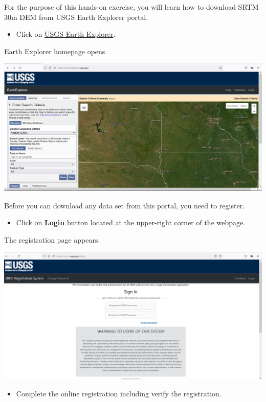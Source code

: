 \documentclass[
  letterpaper,
  DIV=11,
  numbers=noendperiod]{scrreprt}
\providecommand{\tightlist}{%
  \setlength{\itemsep}{0pt}\setlength{\parskip}{0pt}}\usepackage{longtable,booktabs,array}
\begin{document}
For the purpose of this hands-on exercise, you will learn how to
download SRTM 30m DEM from USGS Earth Explorer portal.

\begin{itemize}
\tightlist
\item
  Click on \href{https://earthexplorer.usgs.gov/}{USGS Earth Explorer}.
\end{itemize}

Earth Explorer homepage opens.

\includegraphics{./img06/image22.jpg}

Before you can download any data set from this portal, you need to
register.

\begin{itemize}
\tightlist
\item
  Click on \textbf{Login} button located at the upper-right corner of
  the webpage.
\end{itemize}

The registration page appears.

\includegraphics{./img06/image23.jpg}

\begin{itemize}
\tightlist
\item
  Complete the online registration including verify the registration.
\end{itemize}
\end{document}
